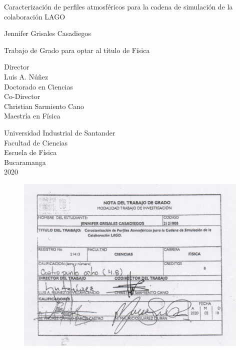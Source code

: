 
\begin{center}

Caracterización de perfiles atmosféricos para la cadena de simulación de la colaboración LAGO \vspace{1.5cm}

Jennifer Grisales Casadiegos\\ \vspace{1.5cm}

Trabajo de Grado para optar al título de Física\\ \vspace{1.5cm}

Director\\
Luis A. Núñez\\
Doctorado en Ciencias\\ \vspace{1cm}
Co-Director\\
Christian Sarmiento Cano\\
Maestría en Física \vspace{1.5cm}

Universidad Industrial de Santander\\
Facultad de Ciencias\\
Escuela de Física\\
Bucaramanga\\
2020\\

\end{center}


\newpage

\begin{figure}[htb!]
\centering
\includegraphics[width=1.0\textwidth]{Secs/NOTA_TESIS.pdf}
\end{figure}

